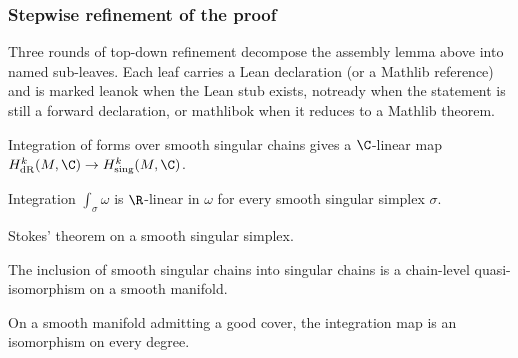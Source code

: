 \subsubsection*{Stepwise refinement of the proof}

Three rounds of top-down refinement decompose the assembly
lemma above into named sub-leaves.  Each leaf carries a Lean
declaration (or a Mathlib reference) and is marked
\textsf{leanok} when the Lean stub exists, \textsf{notready}
when the statement is still a forward declaration, or
\textsf{mathlibok} when it reduces to a Mathlib theorem.

\begin{lemma}
\label{lem:deRham-integration-descends}
Integration of forms over smooth singular chains gives a $\C$-linear map $H^{k}_{\mathrm{dR}}(M, \C) \to H^{k}_{\mathrm{sing}}(M, \C)$.
\leanok
\end{lemma}

\begin{lemma}
\label{lem:deRham-integration-simplex}
Integration $\int_{\sigma} \omega$ is $\R$-linear in $\omega$ for every smooth singular simplex $\sigma$.
\leanok
\end{lemma}

\begin{lemma}[Stokes for a simplex: $\int_{\sigma} d\omega = \int_{\partial\sigma} \omega$]
\label{lem:deRham-stokes-simplex}
Stokes' theorem on a smooth singular simplex.
\leanok
\end{lemma}

\begin{lemma}
\label{lem:deRham-smooth-quasi-iso}
The inclusion of smooth singular chains into singular chains is a chain-level quasi-isomorphism on a smooth manifold.
\leanok
\end{lemma}

\begin{lemma}
\label{lem:deRham-iso-via-good-cover}
On a smooth manifold admitting a good cover, the integration map is an isomorphism on every degree.
\leanok
\end{lemma}

